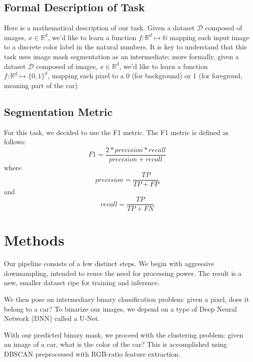 \documentclass[paper=letter, fontsize=12pt]{article}
\numberwithin{equation}{section} %
\numberwithin{figure}{section} %
\numberwithin{table}{section} %
\begin{document}
\subsection{Formal Description of Task}

Here is a mathematical description of our task.  Given a dataset $\mathcal{D}$
composed of images, $x \in \mathbb{R}^{d}$, we'd like to learn a function $f :
\mathbb{R}^{d} \mapsto \mathbb{N}$ mapping each input image to
a discrete color label in the natural numbers.  It is key to understand that
this task uses image mask segmentation as an intermediate; more formally,
given a dataset $\mathcal{D}$ composed of images, $x \in \mathbb{R}^{d}$, we'd
like to learn a function $f : \mathbb{R}^{d} \mapsto \{0, 1\}^{d}$, mapping
each pixel to a 0 (for background) or 1 (for foregroud, meaning part of the car)

\subsection{Segmentation Metric}

For this task, we decided to use the F1 metric. The F1 metric is defined as follows:
\begin{equation}
    F1 = \frac{2*precision*recall}{precision + recall}
\end{equation}
where
\begin{equation}
    precision = \frac{TP}{TP + FP}
\end{equation}
and
\begin{equation}
    recall = \frac{TP}{TP + FN}
\end{equation}

\section{Methods}

Our pipeline consists of a few distinct steps.  We begin with aggressive
downsampling, intended to reuce the need for processing power. The result is a
new, smaller dataset ripe for training and inference.

We then pose an intermediary binary classification problem: given a pixel, does
it belong to a car?  To binarize our images, we depend on a type of Deep Neural Network
(DNN) called a U-Net.

With our predicted binary mask, we proceed with the clustering problem: given an image of
a car, what is the color of the car? This is accomplished using DBSCAN preprocessed
with RGB-ratio feature extraction.
\end{document}
